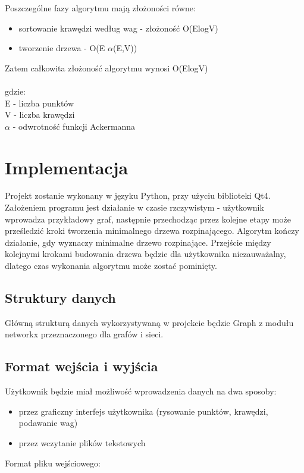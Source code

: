 \documentclass[paper=a4, fontsize=11pt]{scrartcl} %
\numberwithin{equation}{section} %
\numberwithin{figure}{section} %
\numberwithin{table}{section} %
\begin{document}
Poszczególne fazy algorytmu mają złożoności równe:
\begin{itemize}
	\item sortowanie krawędzi według wag - złożoność O(ElogV)
	\item tworzenie drzewa - O(E $\alpha$(E,V))
\end{itemize}
Zatem całkowita złożoność algorytmu wynosi O(ElogV) \\ \\
gdzie: \\ E - liczba punktów \\
V - liczba krawędzi \\
$\alpha$ - odwrotność funkcji Ackermanna


\section{Implementacja}

Projekt zostanie wykonany w języku Python, przy użyciu biblioteki Qt4. Założeniem programu jest działanie w czasie rzczywistym - użytkownik wprowadza przykładowy graf, następnie przechodząc przez kolejne etapy może prześledzić kroki tworzenia minimalnego drzewa rozpinającego. Algorytm kończy działanie, gdy wyznaczy minimalne drzewo rozpinające.
Przejście między kolejnymi krokami budowania drzewa będzie dla użytkownika niezauważalny, dlatego  czas wykonania algorytmu może zostać pominięty.

\subsection{Struktury danych}

Główną strukturą danych wykorzystywaną w projekcie będzie Graph z modułu networkx przeznaczonego dla grafów i sieci.

\subsection{Format wejścia i wyjścia}

Użytkownik będzie miał możliwość wprowadzenia danych na dwa sposoby:

\begin{itemize}
\item przez graficzny interfejs użytkownika (rysowanie punktów, krawędzi, podawanie wag)
\item przez wczytanie plików tekstowych
\end{itemize}

Format pliku wejściowego:
\end{document}
